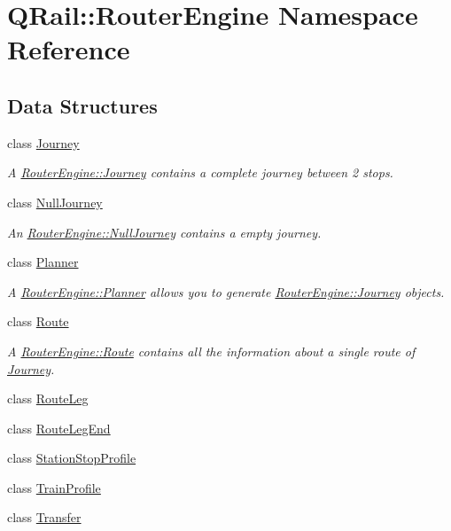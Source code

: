 \hypertarget{namespaceQRail_1_1RouterEngine}{}\section{Q\+Rail\+::Router\+Engine Namespace Reference}
\label{namespaceQRail_1_1RouterEngine}
\subsection*{Data Structures}
\begin{DoxyCompactItemize}
\item 
class \mbox{\hyperlink{classQRail_1_1RouterEngine_1_1Journey}{Journey}}
\begin{DoxyCompactList}\small\item\em A \mbox{\hyperlink{classQRail_1_1RouterEngine_1_1Journey}{Router\+Engine\+::\+Journey}} contains a complete journey between 2 stops. \end{DoxyCompactList}\item 
class \mbox{\hyperlink{classQRail_1_1RouterEngine_1_1NullJourney}{Null\+Journey}}
\begin{DoxyCompactList}\small\item\em An \mbox{\hyperlink{classQRail_1_1RouterEngine_1_1NullJourney}{Router\+Engine\+::\+Null\+Journey}} contains a empty journey. \end{DoxyCompactList}\item 
class \mbox{\hyperlink{classQRail_1_1RouterEngine_1_1Planner}{Planner}}
\begin{DoxyCompactList}\small\item\em A \mbox{\hyperlink{classQRail_1_1RouterEngine_1_1Planner}{Router\+Engine\+::\+Planner}} allows you to generate \mbox{\hyperlink{classQRail_1_1RouterEngine_1_1Journey}{Router\+Engine\+::\+Journey}} objects. \end{DoxyCompactList}\item 
class \mbox{\hyperlink{classQRail_1_1RouterEngine_1_1Route}{Route}}
\begin{DoxyCompactList}\small\item\em A \mbox{\hyperlink{classQRail_1_1RouterEngine_1_1Route}{Router\+Engine\+::\+Route}} contains all the information about a single route of \mbox{\hyperlink{classQRail_1_1RouterEngine_1_1Journey}{Journey}}. \end{DoxyCompactList}\item 
class \mbox{\hyperlink{classQRail_1_1RouterEngine_1_1RouteLeg}{Route\+Leg}}
\item 
class \mbox{\hyperlink{classQRail_1_1RouterEngine_1_1RouteLegEnd}{Route\+Leg\+End}}
\item 
class \mbox{\hyperlink{classQRail_1_1RouterEngine_1_1StationStopProfile}{Station\+Stop\+Profile}}
\item 
class \mbox{\hyperlink{classQRail_1_1RouterEngine_1_1TrainProfile}{Train\+Profile}}
\item 
class \mbox{\hyperlink{classQRail_1_1RouterEngine_1_1Transfer}{Transfer}}
\end{DoxyCompactItemize}
